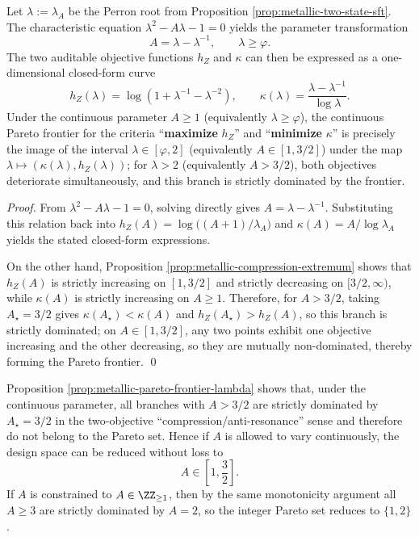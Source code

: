 \begin{proposition}\label{prop:metallic-pareto-frontier-lambda}
Let \(\lambda:=\lambda_A\) be the Perron root from Proposition \ref{prop:metallic-two-state-sft}. The characteristic equation
\(\lambda^2-A\lambda-1=0\) yields the parameter transformation
\[
A=\lambda-\lambda^{-1},\qquad \lambda\ge \varphi.
\]
The two auditable objective functions \(h_Z\) and \(\kappa\) can then be expressed as a one-dimensional closed-form curve
\[
h_Z(\lambda)=\log\!\left(1+\lambda^{-1}-\lambda^{-2}\right),
\qquad
\kappa(\lambda)=\frac{\lambda-\lambda^{-1}}{\log\lambda}.
\]
Under the continuous parameter \(A\ge 1\) (equivalently \(\lambda\ge\varphi\)), the continuous Pareto frontier for the criteria ``\textbf{maximize} \(h_Z\)'' and ``\textbf{minimize} \(\kappa\)'' is precisely the image of the interval \(\lambda\in[\varphi,2]\) (equivalently \(A\in[1,3/2]\)) under the map \(\lambda\mapsto(\kappa(\lambda),h_Z(\lambda))\);
for \(\lambda>2\) (equivalently \(A>3/2\)), both objectives deteriorate simultaneously, and this branch is strictly dominated by the frontier.
\end{proposition}
\begin{proof}
From \(\lambda^2-A\lambda-1=0\), solving directly gives \(A=\lambda-\lambda^{-1}\). Substituting this relation back into
\(
h_Z(A)=\log\bigl((A+1)/\lambda_A\bigr)
\)
and
\(
\kappa(A)=A/\log\lambda_A
\)
yields the stated closed-form expressions.
\par
On the other hand, Proposition \ref{prop:metallic-compression-extremum} shows that \(h_Z(A)\) is strictly increasing on \([1,3/2]\) and strictly decreasing on \([3/2,\infty)\), while \(\kappa(A)\) is strictly increasing on \(A\ge 1\).
Therefore, for \(A>3/2\), taking \(A_\star=3/2\) gives \(\kappa(A_\star)<\kappa(A)\) and \(h_Z(A_\star)>h_Z(A)\), so this branch is strictly dominated; on \(A\in[1,3/2]\), any two points exhibit one objective increasing and the other decreasing, so they are mutually non-dominated, thereby forming the Pareto frontier. \qed
\end{proof}

\begin{remark}\label{rem:metallic-design-space-reduction}
Proposition \ref{prop:metallic-pareto-frontier-lambda} shows that, under the continuous parameter, all branches with \(A>3/2\) are strictly dominated by \(A_\star=3/2\) in the two-objective ``compression/anti-resonance'' sense and therefore do not belong to the Pareto set.
Hence if \(A\) is allowed to vary continuously, the design space can be reduced without loss to
\[
A\in\left[1,\frac{3}{2}\right].
\]
If \(A\) is constrained to \(A\in\ZZ_{\ge 1}\), then by the same monotonicity argument all \(A\ge 3\) are strictly dominated by \(A=2\), so the integer Pareto set reduces to \(\{1,2\}\).
\end{remark}

